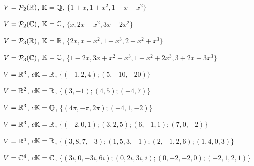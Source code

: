 \documentclass[12pt]{exam}
\begin{document}
    \begin{exercicio}
        $V = \mathcal{P}_2(\mathbb{R})$, $\mathbb{K} = \mathbb{Q}$, $\{1 + x, 1 + x^2, 1 - x - x^2\}$
    \end{exercicio}

    \begin{exercicio}
        $V = \mathcal{P}_2(\mathbb{C})$, $\mathbb{K} = \mathbb{C}$, $\{x, 2x - x^2, 3x + 2x^2\}$
    \end{exercicio}

    \begin{exercicio}
        $V = \mathcal{P}_3(\mathbb{R})$, $\mathbb{K} = \mathbb{R}$, $\{2x, x - x^2, 1 + x^3, 2 - x^2 + x^3\}$
    \end{exercicio}
    
    \begin{exercicio}
        $V = \mathcal{P}_3(\mathbb{C})$, $\mathbb{K} = \mathbb{C}$, $\{1 - 2x, 3x + x^2 - x^3, 1 + x^2 + 2x^3, 3 + 2x + 3x^3\}$
    \end{exercicio}

    \begin{exercicio}
        $V = \mathbb{R}^3$, $c\mathbb{K} = \mathbb{R}$, $\{(-1, 2, 4); (5, -10, -20)\}$
    \end{exercicio}
    
    \begin{exercicio}
        $V = \mathbb{R}^2$, $c\mathbb{K} = \mathbb{R}$, $\{(3, -1); (4, 5); (-4, 7)\}$
    \end{exercicio}

    \begin{exercicio}
        $V = \mathbb{R}^3$, $c\mathbb{K} = \mathbb{Q}$, $\{(4\pi, -\pi, 2\pi); (-4, 1, -2)\}$
    \end{exercicio}

    \begin{exercicio}
        $V = \mathbb{R}^3$, $c\mathbb{K} = \mathbb{R}$, $\{(-2, 0, 1); (3, 2, 5); (6, -1, 1); (7, 0, -2)\}$
    \end{exercicio}

    \begin{exercicio}
        $V = \mathbb{R}^4$, $c\mathbb{K} = \mathbb{R}$, $\{(3, 8, 7, -3); (1, 5, 3, -1); (2, -1, 2, 6); (1, 4, 0, 3)\}$
    \end{exercicio}

    \begin{exercicio}\label{fimtesteldli}
        $V = \mathbb{C}^4$, $c\mathbb{K} = \mathbb{C}$, $\{(3i, 0, -3i, 6i); (0, 2i, 3i, i); (0, -2, -2, 0); (-2, 1, 2, 1)\}$
    \end{exercicio}
\end{document}
